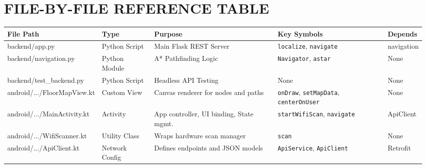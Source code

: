 \documentclass[11pt,a4paper]{article}
\begin{document}
\section{FILE-BY-FILE REFERENCE TABLE}
\begin{center}
\renewcommand{\arraystretch}{1.3}
\begin{tabular}{@{}p{}p{}p{}p{}p{}@{}}
\toprule
\textbf{File Path} & \textbf{Type} & \textbf{Purpose} & \textbf{Key Symbols} & \textbf{Depends} \\ \midrule
backend/app.py & Python Script & Main Flask REST Server & \texttt{localize}, \texttt{navigate} & navigation \\
backend/navigation.py & Python Module & A* Pathfinding Logic & \texttt{Navigator}, \texttt{astar} & None \\
backend/test\_backend.py & Python Script & Headless API Testing & None & None \\
android/.../FloorMapView.kt & Custom View & Canvas renderer for nodes and paths & \texttt{onDraw}, \texttt{setMapData}, \texttt{centerOnUser} & None \\
android/.../MainActivity.kt & Activity & App controller, UI binding, State mgmt. & \texttt{startWifiScan}, \texttt{navigate} & ApiClient \\
android/.../WifiScanner.kt & Utility Class & Wraps hardware scan manager & \texttt{scan} & None \\
android/.../ApiClient.kt & Network Config & Defines endpoints and JSON models & \texttt{ApiService}, \texttt{ApiClient} & Retrofit \\
\bottomrule
\end{tabular}
\end{center}
\end{document}
